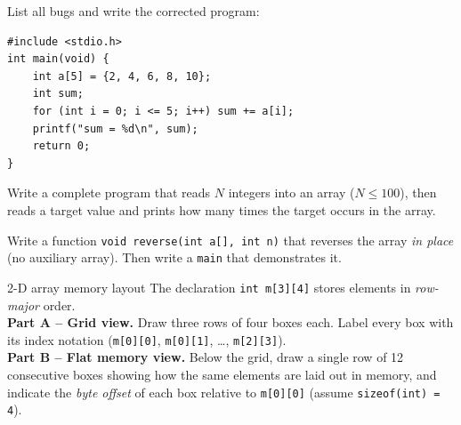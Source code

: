 \documentclass[11pt]{article}
\begin{document}
\begin{bug}
List all bugs and write the corrected program:
\begin{lstlisting}
#include <stdio.h>
int main(void) {
    int a[5] = {2, 4, 6, 8, 10};
    int sum;
    for (int i = 0; i <= 5; i++) sum += a[i];
    printf("sum = %d\n", sum);
    return 0;
}
\end{lstlisting}
\end{bug}

\begin{writecode}
Write a complete program that reads $N$ integers into an array (\(N \leq 100\)),
then reads a target value and prints how many times the target occurs in the array.
\end{writecode}

\begin{writecode}
Write a function \texttt{void reverse(int a[], int n)} that reverses the array
\emph{in place} (no auxiliary array). Then write a \texttt{main} that demonstrates it.
\end{writecode}

\begin{drawex}{2-D array memory layout}
The declaration \texttt{int m[3][4]} stores elements in \emph{row-major} order.\\[4pt]
\textbf{Part A -- Grid view.} Draw three rows of four boxes each. Label every box
with its index notation (\texttt{m[0][0]}, \texttt{m[0][1]}, \ldots, \texttt{m[2][3]}).\\[4pt]
\textbf{Part B -- Flat memory view.} Below the grid, draw a single row of 12
consecutive boxes showing how the same elements are laid out in memory, and
indicate the \emph{byte offset} of each box relative to \texttt{m[0][0]}
(assume \texttt{sizeof(int) = 4}).
\end{drawex}
\end{document}
